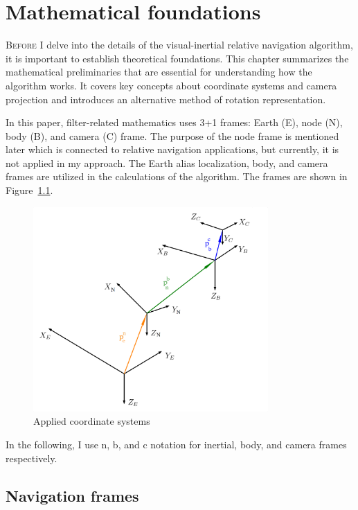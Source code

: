 \chapter{Mathematical foundations}\label{chap:math}

\lettrine{B}{efore} I delve into the details of the visual-inertial relative navigation algorithm, it is important to establish theoretical foundations. This chapter summarizes the mathematical preliminaries that are essential for understanding how the algorithm works. It covers key concepts about coordinate systems and camera projection and introduces an alternative method of rotation representation. 

In this paper, filter-related mathematics uses 3+1 frames: Earth (E), node (N), body (B), and camera (C) frame. The purpose of the node frame is mentioned later which is connected to relative navigation applications, but currently, it is not applied in my approach. The Earth alias localization, body, and camera frames are utilized in the calculations of the algorithm. The frames are shown in Figure~\ref{fig:coord-sys}. 
\begin{figure}[!ht]
    \centering
    \includegraphics[width=0.8\textwidth]{figures/Coord_sys.png}
    \caption{Applied coordinate systems}\label{fig:coord-sys}
\end{figure}

In the following, I use n, b, and c notation for inertial, body, and camera frames respectively.

\section{Navigation frames}

